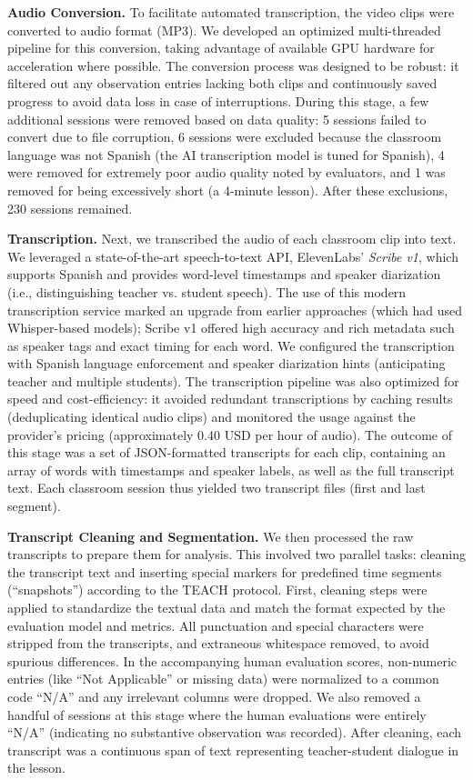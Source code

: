 \documentclass[12pt]{article}
\begin{document}
\textbf{Audio Conversion.} To facilitate automated transcription, the video clips were converted to audio format (MP3). We developed an optimized multi-threaded pipeline for this conversion, taking advantage of available GPU hardware for acceleration where possible. The conversion process was designed to be robust: it filtered out any observation entries lacking both clips and continuously saved progress to avoid data loss in case of interruptions. During this stage, a few additional sessions were removed based on data quality: 5 sessions failed to convert due to file corruption, 6 sessions were excluded because the classroom language was not Spanish (the AI transcription model is tuned for Spanish), 4 were removed for extremely poor audio quality noted by evaluators, and 1 was removed for being excessively short (a 4-minute lesson). After these exclusions, 230 sessions remained.

\textbf{Transcription.} Next, we transcribed the audio of each classroom clip into text. We leveraged a state-of-the-art speech-to-text API, ElevenLabs’ \textit{Scribe v1}, which supports Spanish and provides word-level timestamps and speaker diarization (i.e., distinguishing teacher vs. student speech). The use of this modern transcription service marked an upgrade from earlier approaches (which had used Whisper-based models); Scribe v1 offered high accuracy and rich metadata such as speaker tags and exact timing for each word. We configured the transcription with Spanish language enforcement and speaker diarization hints (anticipating teacher and multiple students). The transcription pipeline was also optimized for speed and cost-efficiency: it avoided redundant transcriptions by caching results (deduplicating identical audio clips) and monitored the usage against the provider’s pricing (approximately 0.40 USD per hour of audio). The outcome of this stage was a set of JSON-formatted transcripts for each clip, containing an array of words with timestamps and speaker labels, as well as the full transcript text. Each classroom session thus yielded two transcript files (first and last segment).

\textbf{Transcript Cleaning and Segmentation.} We then processed the raw transcripts to prepare them for analysis. This involved two parallel tasks: cleaning the transcript text and inserting special markers for predefined time segments (“snapshots”) according to the TEACH protocol. First, cleaning steps were applied to standardize the textual data and match the format expected by the evaluation model and metrics. All punctuation and special characters were stripped from the transcripts, and extraneous whitespace removed, to avoid spurious differences. In the accompanying human evaluation scores, non-numeric entries (like “Not Applicable” or missing data) were normalized to a common code “N/A” and any irrelevant columns were dropped. We also removed a handful of sessions at this stage where the human evaluations were entirely “N/A” (indicating no substantive observation was recorded). After cleaning, each transcript was a continuous span of text representing teacher-student dialogue in the lesson.
\end{document}
